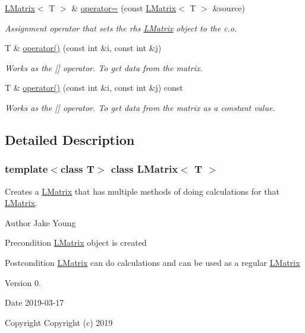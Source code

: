 \begin{DoxyCompactItemize}
\mbox{\hyperlink{class_l_matrix}{L\+Matrix}}$<$ T $>$ \& \mbox{\hyperlink{class_l_matrix_ad4feb8e3706e9ce8fdb07e63d985f52f}{operator=}} (const \mbox{\hyperlink{class_l_matrix}{L\+Matrix}}$<$ T $>$ \&source)
\begin{DoxyCompactList}\small\item\em Assignment operator that sets the rhs \mbox{\hyperlink{class_l_matrix}{L\+Matrix}} object to the c.\+o. \end{DoxyCompactList}\item 
T \& \mbox{\hyperlink{class_l_matrix_aa0b1bc37d56538dbdd4fcb3b88dcc3ec}{operator()}} (const int \&i, const int \&j)
\begin{DoxyCompactList}\small\item\em Works as the \mbox{[}\mbox{]} operator. To get data from the matrix. \end{DoxyCompactList}\item 
T \& \mbox{\hyperlink{class_l_matrix_ae9d404d99117892edd2fbfddfaf929f5}{operator()}} (const int \&i, const int \&j) const
\begin{DoxyCompactList}\small\item\em Works as the \mbox{[}\mbox{]} operator. To get data from the matrix as a constant value. \end{DoxyCompactList}\end{DoxyCompactItemize}


\subsection{Detailed Description}
\subsubsection*{template$<$class T$>$\newline
class L\+Matrix$<$ T $>$}

Creates a \mbox{\hyperlink{class_l_matrix}{L\+Matrix}} that has multiple methods of doing calculations for that \mbox{\hyperlink{class_l_matrix}{L\+Matrix}}. 

\begin{DoxyAuthor}{Author}
Jake Young 
\end{DoxyAuthor}
\begin{DoxyPrecond}{Precondition}
\mbox{\hyperlink{class_l_matrix}{L\+Matrix}} object is created 
\end{DoxyPrecond}
\begin{DoxyPostcond}{Postcondition}
\mbox{\hyperlink{class_l_matrix}{L\+Matrix}} can do calculations and can be used as a regular \mbox{\hyperlink{class_l_matrix}{L\+Matrix}} 
\end{DoxyPostcond}
\begin{DoxyVersion}{Version}
0. 
\end{DoxyVersion}
\begin{DoxyDate}{Date}
2019-\/03-\/17
\end{DoxyDate}
\begin{DoxyCopyright}{Copyright}
Copyright (c) 2019 
\end{DoxyCopyright}


